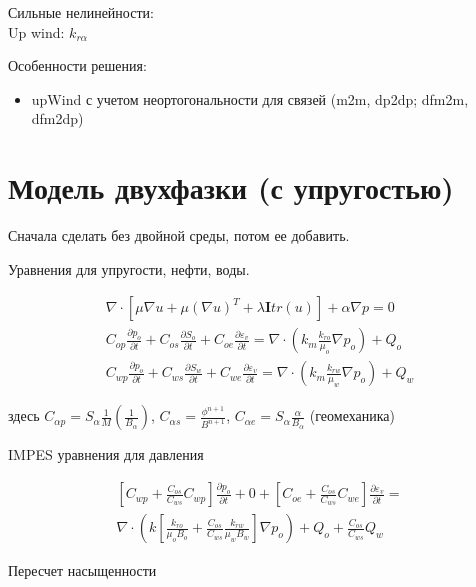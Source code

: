 \documentclass[14pt]{article}
\begin{document}
	Сильные нелинейности:\\	
	Up wind: $k_{r \alpha}$
	
	Особенности решения:
	\begin{itemize}
		\item upWind с учетом неортогональности для связей (m2m, dp2dp; dfm2m, dfm2dp)
	\end{itemize}

\section{Модель двухфазки (с упругостью)}	

	Сначала сделать без двойной среды, потом ее добавить. 
	
	Уравнения для упругости, нефти, воды.
	
	\begin{eqnarray}
	\nabla \cdot \left[ \mu \nabla u + \mu (\nabla u)^T + \lambda \boldsymbol{I} tr(u) \right] + \alpha \nabla p = 0 \label{mech_dpp} \\
	C_{op} \frac{\partial p_{o}}{\partial t} + 
	C_{os} \frac{\partial S_{o}}{\partial t} + 
	C_{oe} \frac{\partial \varepsilon_{v}}{\partial t} = 
	\nabla \cdot \left( k_{m} \frac{k_{ro}}{\mu_{o}} \nabla p_{o} \right) + 
	Q_{o} \\
	C_{wp} \frac{\partial p_{o}}{\partial t} + 
	C_{ws} \frac{\partial S_{w}}{\partial t} + 
	C_{we} \frac{\partial \varepsilon_{v}}{\partial t} = 
	\nabla \cdot \left( k_{m} \frac{k_{rw}}{\mu_{w}} \nabla p_{o} \right) + 
	Q_{w}
	\end{eqnarray}
	
	здесь $C_{\alpha p} = S_{\alpha} \frac{1}{M} (\frac{1}{B_{\alpha}})$, $C_{\alpha s} = \frac{\phi^{n+1}}{B^{n+1}}$, $C_{\alpha e} = S_{\alpha} \frac{\alpha}{B_{\alpha}} $ (геомеханика)
	
	IMPES уравнения для давления
	
	\begin{eqnarray}
		\left[ C_{wp} + \frac{C_{os}}{C_{ws}} C_{wp} \right] \frac{\partial p_{o}}{\partial t} + 
		0 + 
		\left[C_{oe} + \frac{C_{os}}{C_{ws}} C_{we} \right] \frac{\partial \varepsilon_{v}}{\partial t} = \\
		\nabla \cdot \left( k \left[ \frac{k_{ro}}{\mu_{o} B_{o}} + \frac{C_{os}}{C_{ws}} \frac{k_{rw}}{\mu_{w} B_{w}} \right] \nabla p_{o} \right) + 
		Q_{o} + \frac{C_{os}}{C_{ws}} Q_{w}
	\end{eqnarray}
	
	Пересчет насыщенности
	
\end{document}
